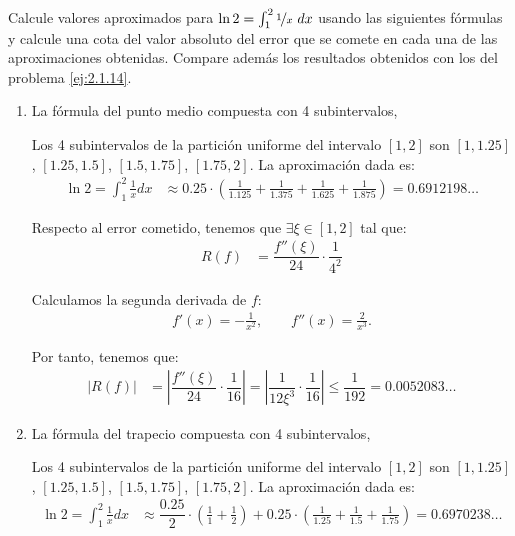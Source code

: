 \begin{ejercicio}\label{ej:2.1.18}
    Calcule valores aproximados para $\ln 2 = \int_{1}^{2} \nicefrac{1}{x}\ dx$ usando las siguientes fórmulas y calcule una cota del valor absoluto del error que se comete en cada una de las aproximaciones obtenidas. Compare además los resultados obtenidos con los del problema \ref{ej:2.1.14}.
    \begin{enumerate}
        \item La fórmula del punto medio compuesta con 4 subintervalos,
        
        Los 4 subintervalos de la partición uniforme del intervalo $[1, 2]$ son $[1, 1.25]$, $[1.25, 1.5]$, $[1.5, 1.75]$, $[1.75, 2]$. La aproximación dada es:
        \begin{align*}
            \ln 2 = \int_{1}^{2} \frac{1}{x} dx &\approx 0.25\cdot \left(\frac{1}{1.125} + \frac{1}{1.375} + \frac{1}{1.625} + \frac{1}{1.875}\right) = 0.6912198\ldots
        \end{align*}

        Respecto al error cometido, tenemos que $\exists \xi \in [1, 2]$ tal que:
        \begin{align*}
            R(f) &= \dfrac{f''(\xi)}{24} \cdot \dfrac{1}{4^2}
        \end{align*}

        Calculamos la segunda derivada de $f$:
        \begin{align*}
            f'(x) = -\frac{1}{x^2},\qquad
            f''(x) = \frac{2}{x^3}.
        \end{align*}

        Por tanto, tenemos que:
        \begin{align*}
            |R(f)| &= \left| \dfrac{f''(\xi)}{24} \cdot \dfrac{1}{16} \right| = \left| \dfrac{1}{12\xi^3} \cdot \dfrac{1}{16} \right| \leq \dfrac{1}{192} = 0.0052083\ldots
        \end{align*}
        \item La fórmula del trapecio compuesta con 4 subintervalos,
        
        Los 4 subintervalos de la partición uniforme del intervalo $[1, 2]$ son $[1, 1.25]$, $[1.25, 1.5]$, $[1.5, 1.75]$, $[1.75, 2]$. La aproximación dada es:
        \begin{align*}
            \ln 2 = \int_{1}^{2} \frac{1}{x} dx &\approx \dfrac{0.25}{2}\cdot \left(\frac{1}{1} + \frac{1}{2}\right) + 0.25\cdot \left(\frac{1}{1.25} + \frac{1}{1.5} + \frac{1}{1.75}\right) = 0.6970238\ldots
        \end{align*}


\end{enumerate}
\end{ejercicio}
